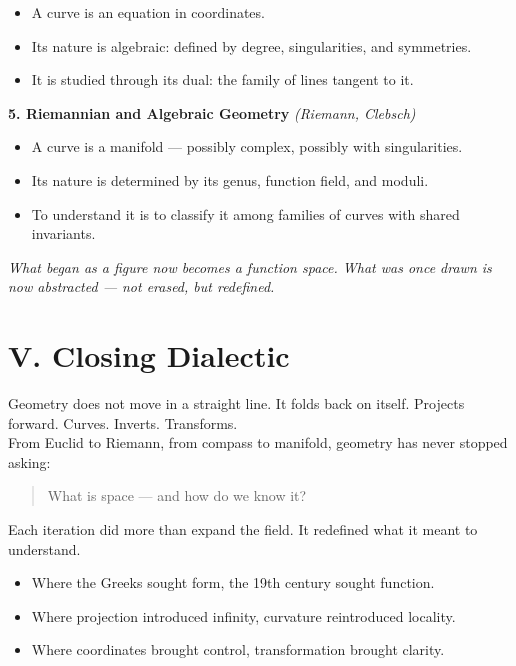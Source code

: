 \documentclass[9pt]{article}
\begin{document}
\begin{itemize}
  \item A curve is an equation in coordinates.
  \item Its nature is algebraic: defined by degree, singularities, and symmetries.
  \item It is studied through its dual: the family of lines tangent to it.
\end{itemize}

\bigskip

\textbf{5. Riemannian and Algebraic Geometry} \hfill \textit{(Riemann, Clebsch)}

\begin{itemize}
  \item A curve is a manifold — possibly complex, possibly with singularities.
  \item Its nature is determined by its genus, function field, and moduli.
  \item To understand it is to classify it among families of curves with shared invariants.
\end{itemize}

\bigskip

\textit{What began as a figure now becomes a function space.  
What was once drawn is now abstracted — not erased, but redefined.}

\newpage

\section*{V. Closing Dialectic}

Geometry does not move in a straight line.  
It folds back on itself. Projects forward. Curves. Inverts. Transforms.\\

\noindent
From Euclid to Riemann, from compass to manifold, geometry has never stopped asking:  

\begin{quote}
What is space — and how do we know it?
\end{quote}

\noindent
Each iteration did more than expand the field.  
It redefined what it meant to understand.\\

\begin{itemize}
  \item Where the Greeks sought form, the 19th century sought function.
  \item Where projection introduced infinity, curvature reintroduced locality.
  \item Where coordinates brought control, transformation brought clarity.
\end{itemize}
\end{document}
